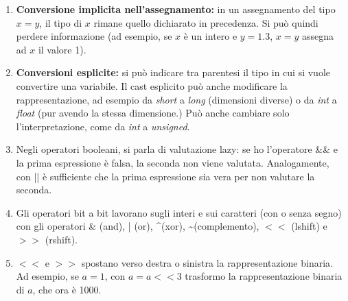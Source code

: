 \documentclass[a4paper,11pt]{article}
\begin{document}
\begin{enumerate}[resume]
\begin{itemize}
	\end{itemize}
	\item \textbf{Conversione implicita nell'assegnamento:} in un assegnamento del tipo $x=y$, il tipo di $x$ rimane quello dichiarato in precedenza. Si può quindi perdere informazione (ad esempio, se $x$ è un intero e $y=1.3$, $x=y$ assegna ad $x$ il valore 1).
	\item \textbf{Conversioni esplicite:} si può indicare tra parentesi il tipo in cui si vuole convertire una variabile. Il cast esplicito può anche modificare la rappresentazione, ad esempio da \textit{short} a \textit{long} (dimensioni diverse) o da \textit{int} a \textit{float} (pur avendo la stessa dimensione.) Può anche cambiare solo l'interpretazione, come da \textit{int} a \textit{unsigned}.
	\item Negli operatori booleani, si parla di valutazione lazy: se ho l'operatore \&\& e la prima espressione è falsa, la seconda non viene valutata. Analogamente, con || è sufficiente che la prima espressione sia vera per non valutare la seconda.
	\item Gli operatori bit a bit lavorano sugli interi e sui caratteri (con o senza segno) con gli operatori \& (and), | (or), \textasciicircum (xor), \textasciitilde (complemento), $<<$ (lshift) e $>>$ (rshift).
	\item $<<$ e $>>$ spostano verso destra o sinistra la rappresentazione binaria. Ad esempio, se $a=1$, con $a=a<<3$ trasformo la rappresentazione binaria di $a$, che ora è 1000. 
\end{enumerate}
\end{document}
